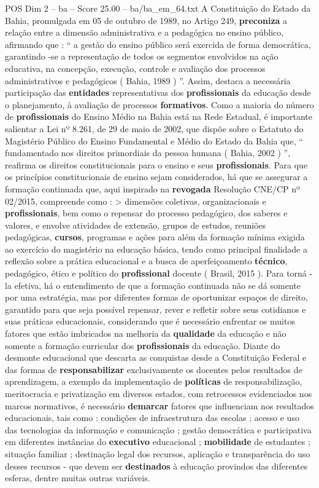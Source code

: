 \begin{textsample}{POS Dim 2 – ba – Score 25.00 – ba/ba\_em\_64.txt}
A Constituição do Estado da Bahia, promulgada em 05 de outubro de 1989, no Artigo 249, \textbf{preconiza} a relação entre a dimensão administrativa e a pedagógica no ensino público, afirmando que : “ a gestão do ensino público será exercida de forma democrática, garantindo -se a representação de todos os segmentos envolvidos na ação educativa, na concepção, execução, controle e avaliação dos processos administrativos e pedagógicos ( Bahia, 1989 ) ”.
Assim, destaca a necessária participação das \textbf{entidades} representativas dos \textbf{profissionais} da educação desde o planejamento, à avaliação de processos \textbf{formativos}.
Como a maioria do número de \textbf{profissionais} do Ensino Médio na Bahia está na Rede Estadual, é importante salientar a Lei nº 8.261, de 29 de maio de 2002, que dispõe sobre o Estatuto do Magistério Público do Ensino Fundamental e Médio do Estado da Bahia que, “ fundamentado nos direitos primordiais da pessoa humana ( Bahia, 2002 ) ”, reafirma os direitos constitucionais para o ensino e seus \textbf{profissionais}.
Para que os princípios constitucionais de ensino sejam considerados, há que se assegurar a formação continuada que, aqui inspirado na \textbf{revogada} Resolução CNE/CP nº 02/2015, compreende como : > dimensões coletivas, organizacionais e \textbf{profissionais}, bem como o repensar do processo pedagógico, dos saberes e valores, e envolve atividades de extensão, grupos de estudos, reuniões pedagógicas, \textbf{cursos}, programas e ações para além da formação mínima exigida ao exercício do magistério na educação básica, tendo como principal finalidade a reflexão sobre a prática educacional e a busca de aperfeiçoamento \textbf{técnico}, pedagógico, ético e político do \textbf{profissional} docente ( Brasil, 2015 ).
Para torná -la efetiva, há o entendimento de que a formação continuada não se dá somente por uma estratégia, mas por diferentes formas de oportunizar espaços de direito, garantido para que seja possível repensar, rever e refletir sobre seus cotidianos e suas práticas educacionais, considerando que é necessário enfrentar os muitos fatores que estão imbricados na melhoria da \textbf{qualidade} da educação e não somente a formação curricular dos \textbf{profissionais} da educação.
Diante do desmonte educacional que descarta as conquistas desde a Constituição Federal e das formas de \textbf{responsabilizar} exclusivamente os docentes pelos resultados de aprendizagem, a exemplo da implementação de \textbf{políticas} de responsabilização, meritocracia e privatização em diversos estados, com retrocessos evidenciados nos marcos normativos, é necessário \textbf{demarcar} fatores que influenciam nos resultados educacionais, tais como : condições de infraestrutura das escolas ; acesso e uso das tecnologias da informação e comunicação ; gestão democrática e participativa em diferentes instâncias do \textbf{executivo} educacional ; \textbf{mobilidade} de estudantes ; situação familiar ; destinação legal dos recursos, aplicação e transparência do uso desses recursos - que devem ser \textbf{destinados} à educação provindos das diferentes esferas, dentre muitas outras variáveis.

\end{textsample}
